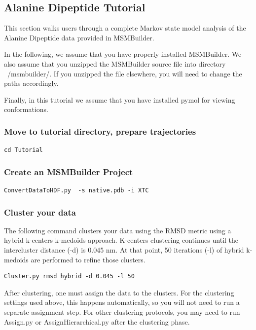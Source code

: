 \documentclass[12pt]{article}
\begin{document}
\subsection{Alanine Dipeptide Tutorial}

This section walks users through a complete Markov state model analysis of the Alanine Dipeptide data provided in MSMBuilder.

In the following, we assume that you have properly installed MSMBuilder.  We also assume that you unzipped the MSMBuilder source file into directory ~/msmbuilder/.  If you unzipped the file elsewhere, you will need to change the paths accordingly.  

Finally, in this tutorial we assume that you have installed pymol for viewing conformations.

\subsubsection{Move to tutorial directory, prepare trajectories}
\begin{verbatim}
cd Tutorial 
\end{verbatim}

\subsubsection{Create an MSMBuilder Project}
\begin{verbatim}
ConvertDataToHDF.py  -s native.pdb -i XTC
\end{verbatim}

\subsubsection{Cluster your data}

The following command clusters your data using the RMSD metric using a hybrid k-centers k-medoids approach.  K-centers clustering continues until the intercluster distance (-d) is 0.045 nm.  At that point, 50 iterations (-l) of hybrid k-medoids are performed to refine those clusters.

\begin{verbatim}
Cluster.py rmsd hybrid -d 0.045 -l 50
\end{verbatim}

After clustering, one must assign the data to the clusters.  For the clustering settings used above, this happens automatically, so you will not need to run a separate assignment step.  For other clustering protocols, you may need to run Assign.py or AssignHierarchical.py after the clustering phase.  
\end{document}
